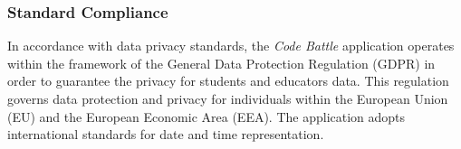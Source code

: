 \subsubsection{Standard Compliance}
In accordance with data privacy standards, the \textit{Code Battle} application operates within the framework of the General Data Protection Regulation (GDPR) in order to guarantee the privacy for students and educators data. This regulation governs data protection and privacy for individuals within the European Union (EU) and the European Economic Area (EEA). The application adopts international standards for date and time representation.

